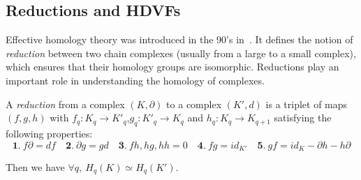 \documentclass[runningheads]{llncs}
\let\Oldsubsection\subsection
\renewcommand{\subsection}{\FloatBarrier\Oldsubsection}
\newcommand{\dr}{\partial}
\newcommand{\HC}{HDVF}
\newcommand{\HCs}{HDVFs}
\newcommand\id{id}
\newcommand{\REVIEW}[1]{{\color{red}$[$\textbf{REVIEW: }\textit{#1}$]$}}
\newcommand{\commentAlex}[1]{{\textit{\color{magenta}#1}}}
\begin{document}
\subsection{Reductions and \HCs}
Effective homology theory was introduced in the 90's in~\cite{Sergeraert1986}.
It defines the notion of \textit{reduction} between two chain complexes (usually from a large to a small complex), which ensures that their homology groups are isomorphic.
Reductions play an important role in understanding the homology of complexes.
\begin{definition}\label{def:reduction}
    A \emph{reduction} from a complex $(K,\dr)$ to a complex $(K',d)$ is a triplet of maps $(f,g,h)$ with $f_q:K_q\to K'_q$,\quad $g_q:K'_q\to K_q$ and $h_q : K_q\to K_{q+1}$ satisfying the following properties:
    $$
        \mathbf{1.}~f \dr = d f \quad
        \mathbf{2.}~\dr g = g d \quad
        \mathbf{3.}~fh, hg, hh = 0 \quad
        \mathbf{4.}~f g = \id_{K'} \quad
        \mathbf{5.}~g f = id_K - \dr h - h \dr
    $$

    Then we have $\forall q,\ H_q(K) \simeq H_q(K')$.
\end{definition}
\end{document}
